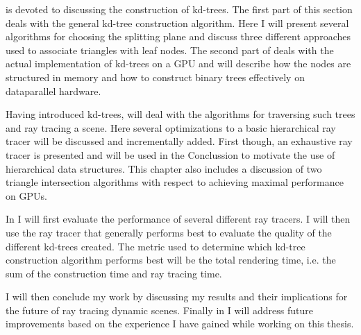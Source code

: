  is devoted to discussing the construction of
kd-trees. The first part of this section deals with the general kd-tree
construction algorithm. Here I will present several algorithms for choosing the
splitting plane and discuss three different approaches used to associate
triangles with leaf nodes. The second part of  deals
with the actual implementation of kd-trees on a GPU and will describe how the
nodes are structured in memory and how to construct binary trees effectively on
dataparallel hardware.


Having introduced kd-trees,  will deal with the
algorithms for traversing such trees and ray tracing a scene. Here several
optimizations to a basic hierarchical ray tracer will be discussed and
incrementally added. First though, an exhaustive ray tracer is presented and
will be used in the Conclussion to motivate the use of hierarchical data
structures. This chapter also includes a discussion of two triangle intersection
algorithms with respect to achieving maximal performance on GPUs.


In  I will first evaluate the performance of several
different ray tracers. I will then use the ray tracer that generally performs
best to evaluate the quality of the different kd-trees created. The metric used
to determine which kd-tree construction algorithm performs best will be the
total rendering time, i.e. the sum of the construction time and ray tracing
time.


I will then conclude my work by discussing my results and their implications for
the future of ray tracing dynamic scenes. Finally in  I
will address future improvements based on the experience I have gained while
working on this thesis.

